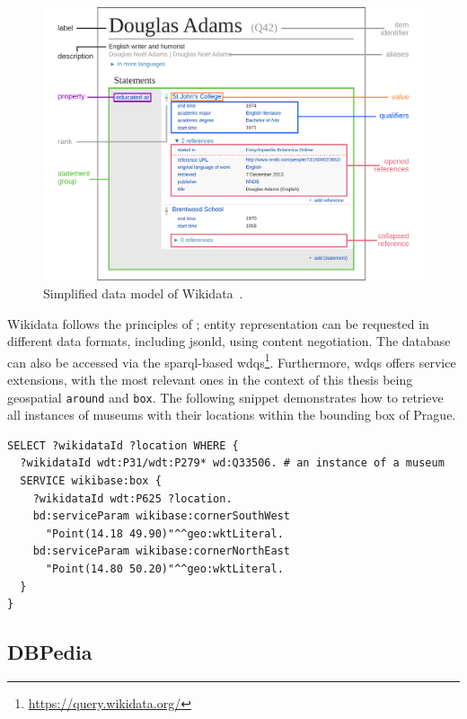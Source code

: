 \begin{figure}[ht!]
\centering
\includegraphics[width=1.0\linewidth]{img/analysis/data-model-of-wikidata.png}
\caption{Simplified data model of Wikidata~\cite{wikidata16}.}
\label{fig:data-model-of-wikidata}
\end{figure}

Wikidata follows the principles of \emph{}; entity representation can be requested in different data formats, including \acs{jsonld}, using content negotiation. The database can also be accessed via the \acs{sparql}-based \ac{wdqs}\footnote{\href{https://query.wikidata.org/}{https://query.wikidata.org/}}. Furthermore, \acs{wdqs} offers service extensions, with the most relevant ones in the context of this thesis being geospatial \texttt{around} and \texttt{box}. The following snippet demonstrates how to retrieve all instances of museums with their locations within the bounding box of Prague.

\begin{verbatim}
SELECT ?wikidataId ?location WHERE {
  ?wikidataId wdt:P31/wdt:P279* wd:Q33506. # an instance of a museum
  SERVICE wikibase:box {
    ?wikidataId wdt:P625 ?location.
    bd:serviceParam wikibase:cornerSouthWest
      "Point(14.18 49.90)"^^geo:wktLiteral.
    bd:serviceParam wikibase:cornerNorthEast
      "Point(14.80 50.20)"^^geo:wktLiteral.
  }
}
\end{verbatim}

\subsection{DBPedia}

